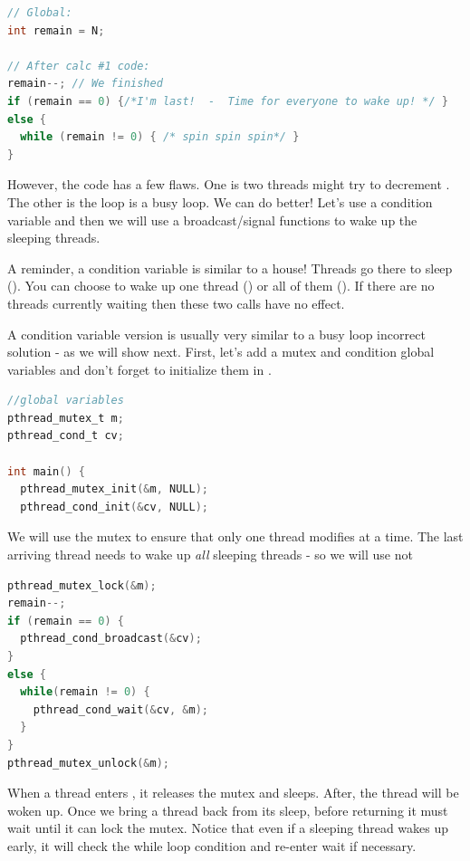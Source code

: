 \begin{lstlisting}[language=C]
// Global:
int remain = N;

// After calc #1 code:
remain--; // We finished
if (remain == 0) {/*I'm last!  -  Time for everyone to wake up! */ }
else {
  while (remain != 0) { /* spin spin spin*/ }
}
\end{lstlisting}

However, the code has a few flaws.
One is two threads might try to decrement .
The other is the loop is a busy loop.
We can do better!
Let's use a condition variable and then we will use a broadcast/signal functions to wake up the sleeping threads.

A reminder, a condition variable is similar to a house! Threads go there to sleep ().
You can choose to wake up one thread () or all of them ().
If there are no threads currently waiting then these two calls have no effect.

A condition variable version is usually very similar to a busy loop incorrect solution - as we will show next.
First, let's add a mutex and condition global variables and don't forget to initialize them in .

\begin{lstlisting}[language=C]
//global variables
pthread_mutex_t m;
pthread_cond_t cv;

int main() {
  pthread_mutex_init(&m, NULL);
  pthread_cond_init(&cv, NULL);
\end{lstlisting}

We will use the mutex to ensure that only one thread modifies  at a time.
The last arriving thread needs to wake up \emph{all} sleeping threads - so we will use  not 

\begin{lstlisting}[language=C]
pthread_mutex_lock(&m);
remain--;
if (remain == 0) {
  pthread_cond_broadcast(&cv);
}
else {
  while(remain != 0) {
    pthread_cond_wait(&cv, &m);
  }
}
pthread_mutex_unlock(&m);
\end{lstlisting}

When a thread enters , it releases the mutex and sleeps.
After, the thread will be woken up.
Once we bring a thread back from its sleep, before returning it must wait until it can lock the mutex.
Notice that even if a sleeping thread wakes up early, it will check the while loop condition and re-enter wait if necessary.

